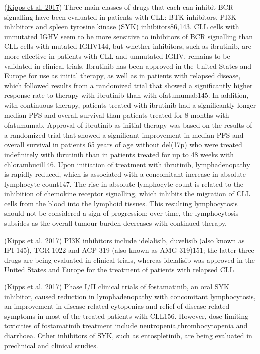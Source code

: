 \documentclass[11pt, a4paper, twosided]{book}
\begin{document}
(\protect\hyperlink{ref-Kipps2017}{Kipps et al. 2017})
Three main classes of drugs that each can inhibit BCR signalling have been evaluated in patients with CLL: BTK inhibitors, PI3K inhibitors and spleen tyrosine kinase (SYK) inhibitors86,143. CLL cells with unmutated IGHV seem to be more sensitive to inhibitors of BCR signalling than CLL cells with mutated IGHV144, but whether inhibitors, such as ibrutinib, are more effective in patients with CLL and unmutated IGHV, remains to be validated in clinical trials.
Ibrutinib has been approved in the United States and Europe for use as initial therapy, as well as in patients with relapsed disease, which followed results from a randomized trial that showed a significantly higher response rate to therapy with ibrutinib than with ofatumumab145. In addition, with continuous therapy, patients treated with ibrutinib had a significantly longer median PFS and overall survival than patients treated for 8 months with ofatumumab. Approval of ibrutinib as initial therapy was based on the results of a randomized trial that showed a significant improvement in median PFS and overall survival in patients 65 years of age without del(17p) who were treated indefinitely with ibrutinib than in patients treated for up to 48 weeks with chlorambucil146.
Upon initiation of treatment with ibrutinib, lymphadenopathy is rapidly reduced, which is associated with a concomitant increase in absolute lymphocyte count147. The rise in absolute lymphocyte count is related to the inhibition of chemokine receptor signalling, which inhibits the migration of CLL cells from the blood into the lymphoid tissues. This resulting lymphocytosis should not be considered a sign of progression; over time, the lymphocytosis subsides as the overall tumour burden decreases with continued therapy.

(\protect\hyperlink{ref-Kipps2017}{Kipps et al. 2017})
PI3K inhibitors include idelalisib, duvelisib (also known as IPI-145), TGR-1022 and ACP-319 (also known as AMG-319)151; the latter three drugs are being evaluated in clinical trials, whereas idelalisib was approved in the United States and Europe for the treatment of patients with relapsed CLL

(\protect\hyperlink{ref-Kipps2017}{Kipps et al. 2017})
Phase I/II clinical trials of fostamatinib, an oral SYK inhibitor, caused reduction in lymphadenopathy with concomitant lymphocytosis, an improvement in disease-related cytopenias and relief of disease-related symptoms in most of the treated patients with CLL156. However, dose-limiting toxicities of fostamatinib treatment include neutropenia,thrombocytopenia and diarrhoea. Other inhibitors of SYK, such as entospletinib, are being evaluated in preclinical and clinical studies.
\end{document}

